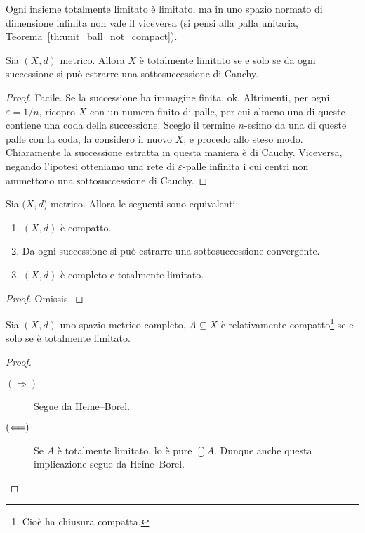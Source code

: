 \begin{remark}
	Ogni insieme totalmente limitato è limitato, ma in uno spazio normato di dimensione infinita non vale il viceversa (si pensi alla palla unitaria, Teorema~\ref{th:unit_ball_not_compact}).
\end{remark}

\begin{lemma}
	Sia $(X,d)$ metrico.
	Allora $X$ è totalmente limitato se e solo se da ogni successione si può estrarre una sottosuccessione di Cauchy.
\end{lemma}
\begin{proof}
	Facile. Se la successione ha immagine finita, ok. Altrimenti, per ogni $\varepsilon = 1/n$, ricopro $X$ con un numero finito di palle, per cui almeno una di queste contiene una coda della successione.
	Sceglo il termine $n$-esimo da una di queste palle con la coda, la considero il nuovo $X$, e procedo allo steso modo.
	Chiaramente la successione estratta in questa maniera è di Cauchy.
	Viceversa, negando l'ipotesi otteniamo una rete di $\varepsilon$-palle infinita i cui centri non ammettono una sottosuccessione di Cauchy.
\end{proof}

\begin{theorem}
\label{th:heine_borel}
	Sia $(X,d$) metrico. Allora le seguenti sono equivalenti:
	\begin{enumerate}
		\item $(X,d)$ è compatto.
		\item Da ogni successione si può estrarre una sottosuccessione convergente.
		\item $(X,d)$ è completo e totalmente limitato.
	\end{enumerate}
\end{theorem}
\begin{proof}
	Omissis.
\end{proof}

\begin{corollary}
	Sia $(X,d)$ uno spazio metrico completo, $A \subseteq X$ è relativamente compatto\footnote{Cioè ha chiusura compatta.} se e solo se è totalmente limitato.
\end{corollary}
\begin{proof}
	\leavevmode
	\begin{description}
		\item[$(\Longrightarrow)$] Segue da Heine--Borel.
		\item[$(\Longleftarrow)$] Se $A$ è totalmente limitato, lo è pure $\closure A$. Dunque anche questa implicazione segue da Heine--Borel.
	\end{description}
\end{proof}

